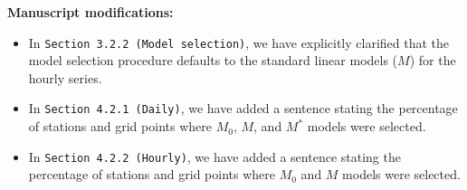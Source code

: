 \documentclass[
  letterpaper,
  DIV=11,
  numbers=noendperiod]{scrartcl}
\providecommand{\tightlist}{%
  \setlength{\itemsep}{0pt}\setlength{\parskip}{0pt}}\usepackage{longtable,booktabs,array}
\begin{document}
\begin{table}

\caption{\label{tbl-mstar-selection}Percentage of locations where each
model category is selected as the best fit for daily precipitation
extremes (\(M_0\) representing no trend, \(M\) a linear trend, and
\(M^*\) a breakpoint trend starting in 1985). All percentages sum to
100\% for each subset.}


\end{table}%

\textbf{Manuscript modifications:}

\begin{itemize}
\tightlist
\item
  In \texttt{Section\ 3.2.2\ (Model\ selection)}, we have explicitly
  clarified that the model selection procedure defaults to the standard
  linear models (\(M\)) for the hourly series.
\item
  In \texttt{Section\ 4.2.1\ (Daily)}, we have added a sentence stating
  the percentage of stations and grid points where \(M_0\), \(M\), and
  \(M^*\) models were selected.
\item
  In \texttt{Section\ 4.2.2\ (Hourly)}, we have added a sentence stating
  the percentage of stations and grid points where \(M_0\) and \(M\)
  models were selected.
\end{itemize}
\end{document}
